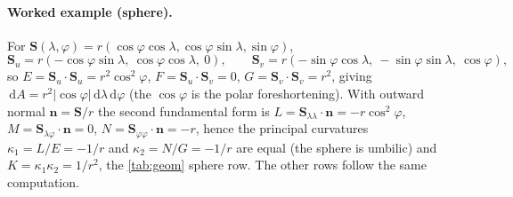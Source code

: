 \documentclass[11pt,a4paper]{article}
\numberwithin{equation}{section}
\newcommand{\abs}[1]{\left\lvert #1 \right\rvert}
\newcommand{\vv}[1]{\mathbf{#1}}
\newcommand{\dd}{\,\mathrm{d}}
\newcommand{\Su}{\vv{S}_u}
\newcommand{\Sv}{\vv{S}_v}
\begin{document}
\paragraph{Worked example (sphere).}
For $\vv{S}(\lambda,\varphi)=r(\cos\varphi\cos\lambda,\cos\varphi\sin\lambda,
\sin\varphi)$,
\[
\Su=r(-\cos\varphi\sin\lambda,\ \cos\varphi\cos\lambda,\ 0),\qquad
\Sv=r(-\sin\varphi\cos\lambda,\ -\sin\varphi\sin\lambda,\ \cos\varphi),
\]
so $E=\Su\!\cdot\!\Su=r^2\cos^2\varphi$, $F=\Su\!\cdot\!\Sv=0$, $G=\Sv\!\cdot\!
\Sv=r^2$, giving $\dd A=r^2\abs{\cos\varphi}\dd\lambda\dd\varphi$ (the
$\cos\varphi$ is the polar foreshortening). With outward normal $\vv{n}=\vv{S}/r$
the second fundamental form is $L=\vv{S}_{\lambda\lambda}\!\cdot\!\vv{n}=
-r\cos^2\varphi$, $M=\vv{S}_{\lambda\varphi}\!\cdot\!\vv{n}=0$,
$N=\vv{S}_{\varphi\varphi}\!\cdot\!\vv{n}=-r$, hence the principal curvatures
$\kappa_1=L/E=-1/r$ and $\kappa_2=N/G=-1/r$ are equal (the sphere is umbilic) and
$K=\kappa_1\kappa_2=1/r^2$, the \cref{tab:geom} sphere row. The other rows
follow the same computation.
\end{document}
